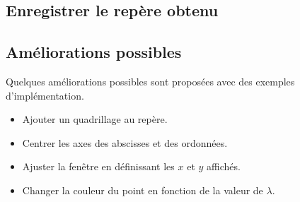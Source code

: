 \subsection*{Enregistrer le repère obtenu}

\vspace{10cm}

\subsection*{Améliorations possibles}

Quelques améliorations possibles sont proposées avec des exemples d'implémentation.
\begin{multicols}{2}
	\begin{itemize}
		\item Ajouter un quadrillage au repère.
		\item Centrer les axes des abscisses et des ordonnées.
		\item Ajuster la fenêtre en définissant les $x$ et $y$ affichés.
		\item Changer la couleur du point en fonction de la valeur de $\lambda$.
	\end{itemize}
	\vfill\null
	
	\columnbreak
	\centering
	\begin{minipage}{.3\textwidth}
	\end{minipage}
\end{multicols}


\newpage
{}


